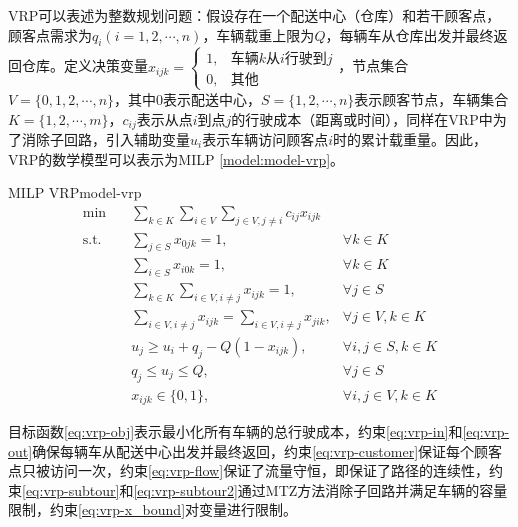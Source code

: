 VRP可以表述为整数规划问题\cite{2014Vehicle}：假设存在一个配送中心（仓库）和若干顾客点，顾客点需求为$q_i(i = 1,2,\cdots,n)$，车辆载重上限为$Q$，每辆车从仓库出发并最终返回仓库。定义决策变量$x_{ijk} = \begin{cases}1, & \text{车辆$k$从$i$行驶到$j$}\\0, & \text{其他} \end{cases}$，节点集合$V = \{0, 1, 2, \cdots, n\}$，其中0表示配送中心，$S = \{1,2,\cdots,n\}$表示顾客节点，车辆集合$K = \{1,2,\cdots,m\}$，$c_{ij}$表示从点$i$到点$j$的行驶成本（距离或时间），同样在VRP中为了消除子回路，引入辅助变量$u_i$表示车辆访问顾客点$i$时的累计载重量。因此，VRP的数学模型可以表示为MILP \ref{model:model-vrp}。

\begin{model}{MILP VRP}{model-vrp}
\begin{align}
    \min \quad & \sum_{k \in K}\sum_{i \in V}\sum_{j \in V, j \neq i} c_{ij}x_{ijk} & \label{eq:vrp-obj}\\
    \text{s.t.} \quad & \sum_{j \in S} x_{0jk} = 1, & \forall k \in K\label{eq:vrp-in}\\
    \quad & \sum_{i \in S} x_{i0k} = 1, & \forall k \in K\label{eq:vrp-out}\\
    \quad & \sum_{k \in K}\sum_{i \in V, i \neq j} x_{ijk} = 1, & \forall j \in S\label{eq:vrp-customer}\\
    \quad & \sum_{i \in V, i \neq j}x_{ijk} = \sum_{i \in V, i \neq j} x_{jik}, & \forall j \in V, k \in K\label{eq:vrp-flow}\\
    \quad & u_j \geq u_i + q_j -Q(1 - x_{ijk}), & \forall i, j \in S, k \in K\label{eq:vrp-subtour}\\
    \quad & q_j \leq u_j \leq Q, & \forall j \in S\label{eq:vrp-subtour2}\\
    \quad & x_{ijk} \in \{0, 1\}, & \forall i, j \in V, k \in K\label{eq:vrp-x_bound}
\end{align}
\end{model}

目标函数\ref{eq:vrp-obj}表示最小化所有车辆的总行驶成本，约束\ref{eq:vrp-in}和\ref{eq:vrp-out}确保每辆车从配送中心出发并最终返回，约束\ref{eq:vrp-customer}保证每个顾客点只被访问一次，约束\ref{eq:vrp-flow}保证了流量守恒，即保证了路径的连续性，约束\ref{eq:vrp-subtour}和\ref{eq:vrp-subtour2}通过MTZ方法消除子回路并满足车辆的容量限制，约束\ref{eq:vrp-x_bound}对变量进行限制。
